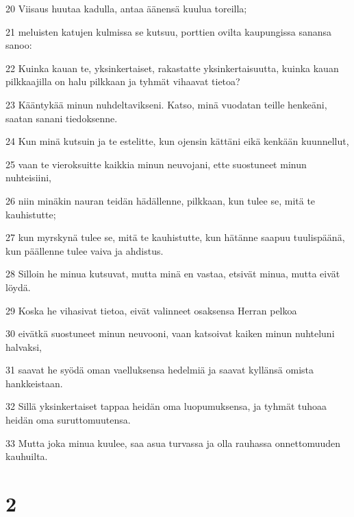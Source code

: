 \par 20 Viisaus huutaa kadulla, antaa äänensä kuulua toreilla;
\par 21 meluisten katujen kulmissa se kutsuu, porttien ovilta kaupungissa sanansa sanoo:
\par 22 Kuinka kauan te, yksinkertaiset, rakastatte yksinkertaisuutta, kuinka kauan pilkkaajilla on halu pilkkaan ja tyhmät vihaavat tietoa?
\par 23 Kääntykää minun nuhdeltavikseni. Katso, minä vuodatan teille henkeäni, saatan sanani tiedoksenne.
\par 24 Kun minä kutsuin ja te estelitte, kun ojensin kättäni eikä kenkään kuunnellut,
\par 25 vaan te vieroksuitte kaikkia minun neuvojani, ette suostuneet minun nuhteisiini,
\par 26 niin minäkin nauran teidän hädällenne, pilkkaan, kun tulee se, mitä te kauhistutte;
\par 27 kun myrskynä tulee se, mitä te kauhistutte, kun hätänne saapuu tuulispäänä, kun päällenne tulee vaiva ja ahdistus.
\par 28 Silloin he minua kutsuvat, mutta minä en vastaa, etsivät minua, mutta eivät löydä.
\par 29 Koska he vihasivat tietoa, eivät valinneet osaksensa Herran pelkoa
\par 30 eivätkä suostuneet minun neuvooni, vaan katsoivat kaiken minun nuhteluni halvaksi,
\par 31 saavat he syödä oman vaelluksensa hedelmiä ja saavat kyllänsä omista hankkeistaan.
\par 32 Sillä yksinkertaiset tappaa heidän oma luopumuksensa, ja tyhmät tuhoaa heidän oma suruttomuutensa.
\par 33 Mutta joka minua kuulee, saa asua turvassa ja olla rauhassa onnettomuuden kauhuilta.

\chapter{2}

